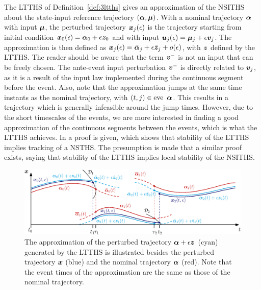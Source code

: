 \documentclass[../DC2019003Bouma.tex]{subfiles}
\begin{document}
The LTTHS of Definition~\ref{def:3ltths} gives an approximation of the NSITHS about the state-input reference trajectory $(\boldsymbol{\alpha},\boldsymbol{\mu})$. With a nominal trajectory $\boldsymbol{\alpha}$ with input $\boldsymbol{\mu}$, the perturbed trajectory ${\boldsymbol{x}}_j(\epsilon)$ is the trajectory starting from initial condition ${\boldsymbol{x}}_0(\epsilon) = \boldsymbol{\alpha}_0 + \epsilon{\boldsymbol{z}}_0$ and with input ${\boldsymbol{u}}_j(\epsilon) = \boldsymbol{\mu}_j + \epsilon{\boldsymbol{v}}_j$. The approximation is then defined as ${\boldsymbol{x}}_j(\epsilon) = \bar{\boldsymbol{\alpha}}_j + \epsilon\bar{{\boldsymbol{z}}}_j + o(\epsilon)$, with ${\boldsymbol{z}}$ defined by the LTTHS. The reader should be aware that the term ${\boldsymbol{v}}^-$ is not an input that can be freely chosen. The ante-event input perturbation ${\boldsymbol{v}}^-$ is directly related to ${\boldsymbol{v}}_j$, as it is a result of the input law implemented during the continuous segment before the event. Also, note that the approximation jumps at the same time instants as the nominal trajectory, with $(t,j) \in \eve\ \alphab$. This results in a trajectory which is generally infeasible around the jump times. However, due to the short timescales of the events, we are more interested in finding a good approximation of the continuous segments between the events, which is what the LTTHS achieves. In \cite{Rijnen2017} a proof is given, which shows that stability of the LTTHS implies tracking of a NSTHS. The presumption is made that a similar proof exists, saying that stability of the LTTHS implies local stability of the NSITHS.

%
\begin{figure}[bt!]
\centering
\includegraphics[width=\textwidth]{refspreadapprox.eps}\caption{The approximation of the perturbed trajectory $\boldsymbol{\alpha} + \epsilon{\boldsymbol{z}}$ (cyan) generated by the LTTHS is illustrated besides the perturbed trajectory ${\boldsymbol{x}}$ (blue) and the nominal trajectory $\boldsymbol{\alpha}$ (red). Note that the event times of the approximation are the same as those of the nominal trajectory.} \label{fig:3refspreadapprox}
\end{figure}
\end{document}
